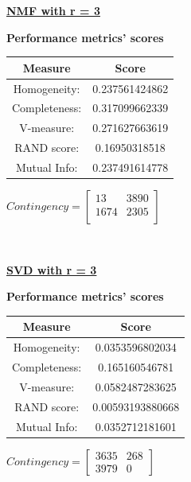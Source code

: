 \documentclass{article}
\begin{document}
\underline{\textbf{NMF with r = 3}} 

\begin{center}
	\textbf{Performance metrics' scores} \\ \vspace{10pt}	
	\begin{tabular}{*{2}{c}}
		\toprule
		\textbf{Measure} & \textbf{Score} \\
		\midrule
		Homogeneity: & 0.237561424862 \\
		\midrule
		Completeness: 		& 0.317099662339 \\
		\midrule
		V-measure:			& 0.271627663619 \\
		\midrule
		RAND score: 		& 0.16950318518 \\
		\midrule
		Mutual Info: 		& 0.237491614778 \\
		\bottomrule
	\end{tabular}
	\qquad
	$Contingency = \left[\begin{array}{*{2}{c}}
		13 & 3890 \\
		1674 & 2305 \\
			\end{array}\right]
		$
\end{center}
\\  \vspace{20pt}


\underline{\textbf{SVD with r = 3}} 

\begin{center}
	\textbf{Performance metrics' scores} \\ \vspace{10pt}	
	\begin{tabular}{*{2}{c}}	
		\toprule
		\textbf{Measure} & \textbf{Score} \\ 
		\midrule
		Homogeneity: & 0.0353596802034 \\
		\midrule 
		Completeness: & 0.165160546781 \\
		\midrule
		V-measure: 	& 0.0582487283625 \\
		\midrule
		RAND score: & 0.00593193880668 \\
		\midrule
		Mutual Info: & 0.0352712181601 \\
		\bottomrule
	\end{tabular}
	\qquad
	$Contingency = \left[ \begin{array}{*{2}{c}}
		3635 & 268 \\
		3979 & 0   
        \end{array}\right]
		$
\end{center}
\newpage
\end{document}
